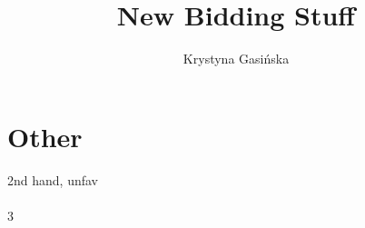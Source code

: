 \documentclass[12pt, a4paper]{article}
\title{New Bidding Stuff}
\author{Krystyna Gasińska}
\begin{document}
\maketitle

\section{Other}

2nd hand, unfav\\
\\
3\hearts
\end{document}
